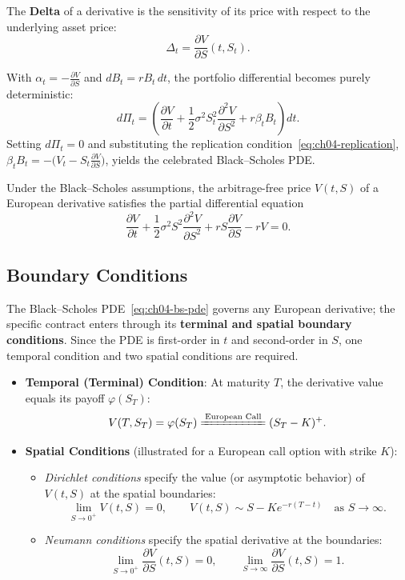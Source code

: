 \begin{definition}[Delta]
    \label{def:ch04-delta}
    The \textbf{Delta} of a derivative is the sensitivity of its price with respect to the underlying asset price:
    \[
        \Delta_t = \frac{\partial V}{\partial S}(t, S_t).
    \]
\end{definition}

With $\alpha_t = -\frac{\partial V}{\partial S}$ and $dB_t = r B_t\,dt$, the portfolio differential becomes purely deterministic:
\[
    d\Pi_t = \left(\frac{\partial V}{\partial t} + \frac{1}{2}\sigma^2 S_t^2 \frac{\partial^2 V}{\partial S^2} + r \beta_t B_t\right)dt.
\]
Setting $d\Pi_t = 0$ and substituting the replication condition~\eqref{eq:ch04-replication}, $\beta_t B_t = -\bigl(V_t - S_t \frac{\partial V}{\partial S}\bigr)$, yields the celebrated Black--Scholes PDE.

\begin{theorem}
    \label{thm:ch04-bs-pde}
    Under the Black--Scholes assumptions, the arbitrage-free price $V(t, S)$ of a European derivative satisfies the partial differential equation
    \begin{equation}
        \label{eq:ch04-bs-pde}
        \frac{\partial V}{\partial t} + \frac{1}{2}\sigma^2 S^2 \frac{\partial^2 V}{\partial S^2} + r S \frac{\partial V}{\partial S} - r V = 0.
    \end{equation}
\end{theorem}

\subsection{Boundary Conditions}
The Black--Scholes PDE~\eqref{eq:ch04-bs-pde} governs any European derivative; the specific contract enters through its \textbf{terminal and spatial boundary conditions}. Since the PDE is first-order in $t$ and second-order in $S$, one temporal condition and two spatial conditions are required.

\begin{itemize}
    \item \textbf{Temporal (Terminal) Condition}: At maturity $T$, the derivative value equals its payoff $\varphi(S_T)$:
    \[
        V(T, S_T) = \varphi(S_T) \xlongequal{\text{European Call}} (S_T - K)^+.
    \]
    \item \textbf{Spatial Conditions} (illustrated for a European call option with strike $K$):
    \begin{itemize}
        \item \emph{Dirichlet conditions} specify the value (or asymptotic behavior) of $V(t, S)$ at the spatial boundaries:
        \[
            \lim_{S \to 0^+} V(t, S) = 0, \qquad
            V(t, S) \sim S - K e^{-r(T-t)} \quad \text{as } S \to \infty.
        \]
        \item \emph{Neumann conditions} specify the spatial derivative at the boundaries:
        \[
            \lim_{S \to 0^+} \frac{\partial V}{\partial S}(t, S) = 0, \qquad
            \lim_{S \to \infty} \frac{\partial V}{\partial S}(t, S) = 1.
        \]
    \end{itemize}
\end{itemize}

